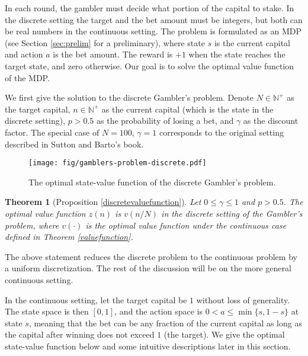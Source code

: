 \documentclass{article}
\theoremstyle{named}
\newtheorem*{namedtheorem}{Theorem}
\newcommand{\NN}{\mathbb{N}}
\begin{document}
In each round, the gambler must decide what portion of the capital to stake. 
In the discrete setting the target and the bet amount must be integers, but both can be real numbers in the continuous setting. 
The problem is formulated as an MDP (see Section \ref{sec:prelim} for a preliminary), where state $s$ is the current capital and action $a$ is the bet amount. 
The reward is $+1$ when the state reaches the target state, and zero otherwise.
Our goal is to solve the optimal value function of the MDP.

We first give the solution to the discrete Gambler's problem. Denote $N\in \NN^+$ as the target capital, $n\in \NN^+$ as the current capital (which is the state in the discrete setting), $p> 0.5$ as the probability of losing a bet, and $\gamma$ as the discount factor. The special case of $N=100$, $\gamma=1$ corresponds to the original setting described in Sutton and Barto's book.

\begin{figure}[t!]
\centering
\texttt{[image: fig/gamblers-problem-discrete.pdf]}
\caption{The optimal state-value function of the discrete Gambler's problem.}
\label{fig:valuefunctiondiscrete}
\end{figure}

\begin{namedtheorem}[Proposition \ref{discretevaluefunction}]
Let $0\leq\gamma\leq 1$ and $p>0.5$. The optimal value function $z(n)$ is $v(n/N)$ in the discrete setting of the Gambler's problem, where $v(\cdot)$ is the optimal value function under the continuous case defined in Theorem \ref{valuefunction}. 
\end{namedtheorem}

The above statement reduces the discrete problem to the continuous problem by a uniform discretization. The rest of the discussion will be on the more general continuous setting. 

In the continuous setting, let the target capital be $1$ without loss of generality. The state space is then $[0,1]$, and the action space is $0<a\leq \min\{s,1-s\}$ at state $s$, meaning that the bet can be any fraction of the current capital as long as the capital after winning does not exceed $1$ (the target). We give the optimal state-value function below and some intuitive descriptions later in this section.
\end{document}
